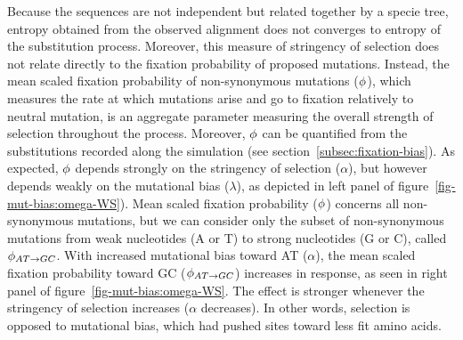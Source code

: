 
Because the sequences are not independent but related together by a specie tree, entropy obtained from the observed alignment does not converges to entropy of the \gls{substitution} process.
Moreover, this measure of stringency of selection does not relate directly to the fixation probability of proposed mutations.
Instead, the mean scaled fixation probability of non-synonymous mutations ($\phi$), which measures the rate at which mutations arise and go to fixation relatively to neutral mutation, is an aggregate parameter measuring the overall strength of selection throughout the process.
Moreover, $\phi$ can be quantified from the \glspl{substitution} recorded along the simulation (see section~\ref{subsec:fixation-bias}).
As expected, $\phi$ depends strongly on the stringency of selection ($\alpha$), but however depends weakly on the mutational bias ($\lambda$), as depicted in left panel of figure~\ref{fig-mut-bias:omega-WS}).
Mean scaled fixation probability ($\phi$) concerns all non-synonymous mutations, but we can consider only the subset of non-synonymous mutations from weak nucleotides (A or T) to strong nucleotides (G or C), called $\phi_{AT \rightarrow GC}$.
With increased mutational bias toward AT ($\alpha$), the mean scaled fixation probability toward GC ($\phi_{AT \rightarrow GC}$) increases in response, as seen in right panel of figure~\ref{fig-mut-bias:omega-WS}.
The effect is stronger whenever the stringency of selection increases ($\alpha$ decreases).
In other words, selection is opposed to mutational bias, which had pushed sites toward less fit amino acids.


